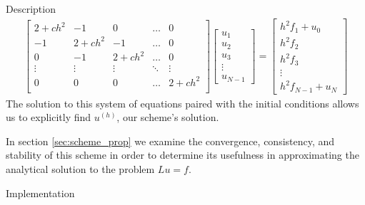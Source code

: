 \begin{subsection}{Description}
\begin{align}
\begin{bmatrix}
      2 + ch^2 & -1 & 0 & \hdots & 0\\
      -1 & 2 + ch^2 & -1 & \hdots & 0\\
      0 & -1 & 2 + ch^2 & \hdots & 0\\
      \vdots & \vdots & \vdots & \ddots & \vdots \\
      0 & 0 & 0 & \hdots & 2+ch^2 \\
    \end{bmatrix}
    \begin{bmatrix}
      u_1 \\
      u_2 \\
      u_3 \\
      \vdots \\
      u_{N-1}
    \end{bmatrix}
    =
    \begin{bmatrix}
      h^2 f_1 + u_0 \\
      h^2 f_2 \\
      h^2 f_3 \\
      \vdots \\
      h^2 f_{N-1} + u_{N}
    \end{bmatrix}
  \end{align}
  The solution to this system of equations paired with the initial conditions
  allows us to explicitly find $u^{(h)}$, our scheme's solution.

  In section \ref{sec:scheme_prop} we examine the convergence, consistency,
  and stability of this scheme in order to determine its usefulness in
  approximating the analytical solution to the problem $Lu = f$.
\end{subsection}

\begin{subsection}{Implementation}
  
\end{subsection}
